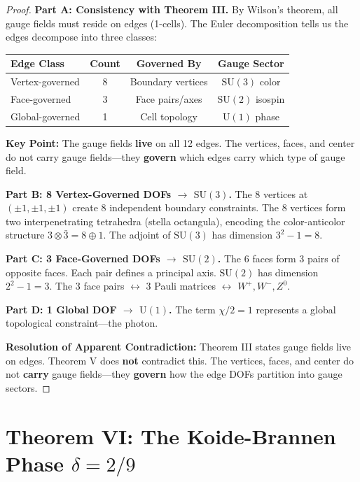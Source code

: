 \documentclass[11pt,a4paper]{article}
\theoremstyle{plain}
\theoremstyle{definition}
\theoremstyle{remark}
\newcommand{\SUthree}{\text{SU}(3)}
\newcommand{\SUtwo}{\text{SU}(2)}
\newcommand{\Uone}{\text{U}(1)}
\begin{document}
\begin{proof}
\textbf{Part A: Consistency with Theorem III.} By Wilson's theorem, all gauge fields must reside on edges (1-cells). The Euler decomposition tells us the edges decompose into three classes:

\begin{center}
\begin{tabular}{lccc}
\toprule
\textbf{Edge Class} & \textbf{Count} & \textbf{Governed By} & \textbf{Gauge Sector} \\
\midrule
Vertex-governed & 8 & Boundary vertices & $\SUthree$ color \\
Face-governed & 3 & Face pairs/axes & $\SUtwo$ isospin \\
Global-governed & 1 & Cell topology & $\Uone$ phase \\
\bottomrule
\end{tabular}
\end{center}

\textbf{Key Point:} The gauge fields \textbf{live} on all 12 edges. The vertices, faces, and center do not carry gauge fields---they \textbf{govern} which edges carry which type of gauge field.

\textbf{Part B: 8 Vertex-Governed DOFs $\to$ $\SUthree$.} The 8 vertices at $(\pm 1, \pm 1, \pm 1)$ create 8 independent boundary constraints. The 8 vertices form two interpenetrating tetrahedra (stella octangula), encoding the color-anticolor structure $3 \otimes \bar{3} = 8 \oplus 1$. The adjoint of $\SUthree$ has dimension $3^2 - 1 = 8$.

\textbf{Part C: 3 Face-Governed DOFs $\to$ $\SUtwo$.} The 6 faces form 3 pairs of opposite faces. Each pair defines a principal axis. $\SUtwo$ has dimension $2^2 - 1 = 3$. The 3 face pairs $\leftrightarrow$ 3 Pauli matrices $\leftrightarrow$ $W^+, W^-, Z^0$.

\textbf{Part D: 1 Global DOF $\to$ $\Uone$.} The term $\chi/2 = 1$ represents a global topological constraint---the photon.

\textbf{Resolution of Apparent Contradiction:} Theorem III states gauge fields live on edges. Theorem V does \textbf{not} contradict this. The vertices, faces, and center do not \textbf{carry} gauge fields---they \textbf{govern} how the edge DOFs partition into gauge sectors.
\end{proof}

\section{Theorem VI: The Koide-Brannen Phase $\delta = 2/9$}
\end{document}
